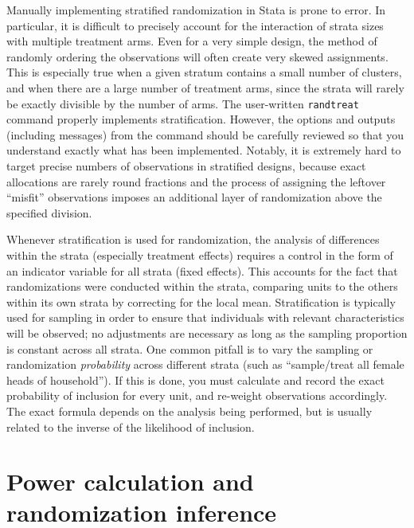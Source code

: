 Manually implementing stratified randomization in Stata is prone to error.
In particular, it is difficult to precisely account
for the interaction of strata sizes with multiple treatment arms.
Even for a very simple design, the method of randomly ordering the observations
will often create very skewed assignments.
This is especially true when a given stratum contains a small number of clusters,
and when there are a large number of treatment arms,
since the strata will rarely be exactly divisible by the number of arms.\cite{carril2017dealing}
The user-written \texttt{randtreat} command properly implements stratification.
However, the options and outputs (including messages) from the command should be carefully reviewed
so that you understand exactly what has been implemented.
Notably, it is extremely hard to target precise numbers of observations
in stratified designs, because exact allocations are rarely round fractions
and the process of assigning the leftover ``misfit'' observations
imposes an additional layer of randomization above the specified division.

Whenever stratification is used for randomization,
the analysis of differences within the strata (especially treatment effects)
requires a control in the form of an indicator variable for all strata (fixed effects).
This accounts for the fact that randomizations were conducted within the strata,
comparing units to the others within its own strata by correcting for the local mean.
Stratification is typically used for sampling
in order to ensure that individuals with relevant characteristics will be observed;
no adjustments are necessary as long as the sampling proportion is constant across all strata.
One common pitfall is to vary the sampling or randomization \textit{probability}
across different strata (such as ``sample/treat all female heads of household'').
If this is done, you must calculate and record the exact probability
of inclusion for every unit, and re-weight observations accordingly.
The exact formula depends on the analysis being performed,
but is usually related to the inverse of the likelihood of inclusion.



\section{Power calculation and randomization inference}

